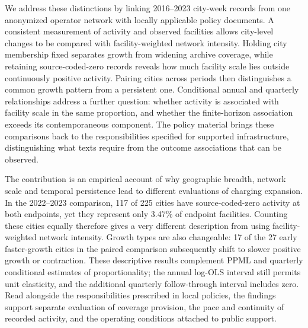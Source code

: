We address these distinctions by linking 2016--2023 city-week records from one anonymized operator network with locally applicable policy documents. A consistent measurement of activity and observed facilities allows city-level changes to be compared with facility-weighted network intensity. Holding city membership fixed separates growth from widening archive coverage, while retaining source-coded-zero records reveals how much facility scale lies outside continuously positive activity. Pairing cities across periods then distinguishes a common growth pattern from a persistent one. Conditional annual and quarterly relationships address a further question: whether activity is associated with facility scale in the same proportion, and whether the finite-horizon association exceeds its contemporaneous component. The policy material brings these comparisons back to the responsibilities specified for supported infrastructure, distinguishing what texts require from the outcome associations that can be observed.

The contribution is an empirical account of why geographic breadth, network scale and temporal persistence lead to different evaluations of charging expansion. In the 2022--2023 comparison, 117 of 225 cities have source-coded-zero activity at both endpoints, yet they represent only 3.47\% of endpoint facilities. Counting these cities equally therefore gives a very different description from using facility-weighted network intensity. Growth types are also changeable: 17 of the 27 early faster-growth cities in the paired comparison subsequently shift to slower positive growth or contraction. These descriptive results complement PPML and quarterly conditional estimates of proportionality; the annual log-OLS interval still permits unit elasticity, and the additional quarterly follow-through interval includes zero. Read alongside the responsibilities prescribed in local policies, the findings support separate evaluation of coverage provision, the pace and continuity of recorded activity, and the operating conditions attached to public support.
